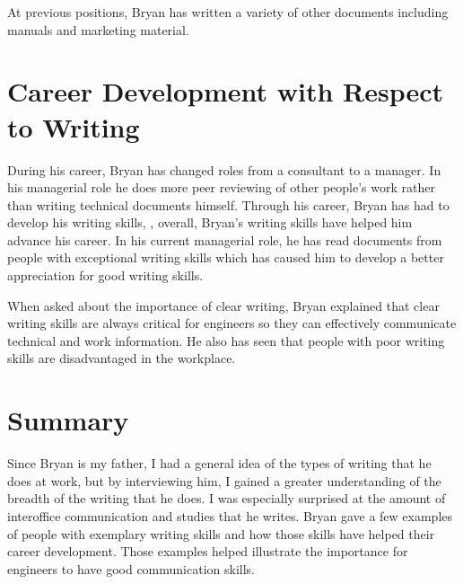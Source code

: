 \documentclass[11pt]{article}
\begin{document}
At previous positions, Bryan has written a variety of other documents including manuals and
marketing material.

\section{Career Development with Respect to Writing}

During his career, Bryan has changed roles from a consultant to a manager. In his managerial role he
does more peer reviewing of other people's work rather than writing technical documents himself.
Through his career, Bryan has had to develop his writing skills, , overall,
Bryan's writing skills have helped him advance his career. In his current managerial role, he has
read documents from people with exceptional writing skills which has caused him to develop a better
appreciation for good writing skills.

When asked about the importance of clear writing, Bryan explained that clear writing skills are
always critical for engineers so they can effectively communicate technical and work information. He
also has seen that people with poor writing skills are disadvantaged in the workplace.

\section{Summary}

Since Bryan is my father, I had a general idea of the types of writing that he does at work, but
by interviewing him, I gained a greater understanding of the breadth of the writing that he does. I
was especially surprised at the amount of interoffice communication and studies that he writes.
Bryan gave a few examples of people with exemplary writing skills and how those skills have helped
their career development. Those examples helped illustrate the importance for engineers to have good
communication skills.

%
%
\end{document}
